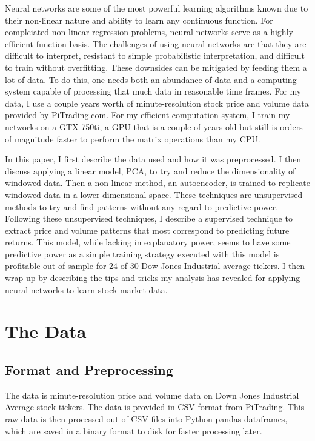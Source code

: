 \documentclass{article}
\begin{document}
Neural networks are some of the most powerful learning algorithms known due
to their non-linear nature and ability to learn any continuous function.
For complciated non-linear regression problems, neural networks serve
as a highly efficient function basis.
The challenges of using neural networks are that they are difficult to
interpret, resistant to simple probabilistic interpretation, and difficult
to train without overfitting. These downsides can be mitigated by feeding
them a lot of data. To do this, one needs both an abundance of data and
a computing system capable of processing that much data in reasonable time
frames. For my data, I use a couple years worth of minute-resolution stock
price and volume data provided by PiTrading.com. For my efficient computation
system, I train my networks on a GTX 750ti, a GPU that is a couple of years old
but still is orders of magnitude faster to perform the matrix operations than 
my CPU.

In this paper, I first describe the data used and how it was preprocessed. I then
discuss applying a linear model, PCA, to try and reduce the dimensionality of
windowed data. Then a non-linear method, an autoencoder, is trained to
replicate windowed data in a lower dimensional space. These techniques are
unsupervised methods to try and find patterns without any regard to predictive
power. Following these unsupervised techniques, I describe a supervised technique
to extract price and volume patterns that most correspond to predicting future
returns. This model, while lacking in explanatory power, seems to have some
predictive power as a simple training strategy executed with this model
is profitable out-of-sample for 24 of 30 Dow Jones Industrial average tickers. 
I then wrap up by describing the tips and tricks my analysis has revealed for
applying neural networks to learn stock market data. 

\section{The Data}

\subsection{Format and Preprocessing}
The data is minute-resolution price and volume data on Down Jones Industrial
Average stock tickers.
The data is provided in CSV format from PiTrading. This raw data is then processed
out of CSV files into Python pandas dataframes, which are saved in a binary format
to disk for faster processing later. 
\end{document}
